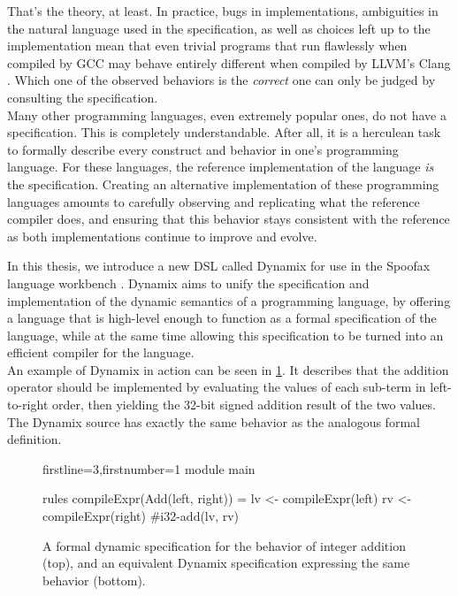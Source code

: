 That's the theory, at least. In practice, bugs in implementations, ambiguities in the natural language used in the specification, as well as choices left up to the implementation mean that even trivial \Cplusplus programs that run flawlessly when compiled by GCC \cite{gcc} may behave entirely different when compiled by LLVM's Clang \cite{clang}. Which one of the observed behaviors is the \textit{correct} one can only be judged by consulting the specification.\\

Many other programming languages, even extremely popular ones, do not have a specification. This is completely understandable. After all, it is a herculean task to formally describe every construct and behavior in one's programming language. For these languages, the reference implementation of the language \textit{is} the specification. Creating an alternative implementation of these programming languages amounts to carefully observing and replicating what the reference compiler does, and ensuring that this behavior stays consistent with the reference as both implementations continue to improve and evolve.\\



In this thesis, we introduce a new \ac{DSL} called Dynamix for use in the Spoofax language workbench \cite{Spoofax2021}. Dynamix aims to unify the specification and implementation of the dynamic semantics of a programming language, by offering a language that is high-level enough to function as a formal specification of the language, while at the same time allowing this specification to be turned into an efficient compiler for the language.\\

An example of Dynamix in action can be seen in \cref{fig:dynamix_addition}. It describes that the addition operator should be implemented by evaluating the values of each sub-term in left-to-right order, then yielding the 32-bit signed addition result of the two values. The Dynamix source has exactly the same behavior as the analogous formal definition.\\

\begin{figure}
  \begin{prooftree}
  \end{prooftree}
  \begin{dynamix*}{firstline=3,firstnumber=1}
module main

rules
  compileExpr(Add(left, right)) = {
    lv <- compileExpr(left)
    rv <- compileExpr(right)
    #i32-add(lv, rv)
  }
  \end{dynamix*}
  \caption{A formal dynamic specification for the behavior of integer addition (top), and an equivalent Dynamix specification expressing the same behavior (bottom).}
  \label{fig:dynamix_addition}
\end{figure}

